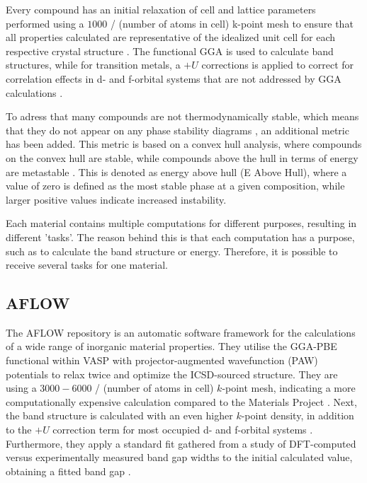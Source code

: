 
Every compound has an initial relaxation of cell and lattice parameters performed using a $1000$ / (number of atoms in cell) k-point mesh to ensure that all properties calculated are representative of the idealized unit cell for each respective crystal structure \cite{Ferrenti2020}. The functional GGA is used to calculate band structures, while for transition metals, a $+U$ corrections is applied to correct for correlation effects in d- and f-orbital systems that are not addressed by GGA calculations \cite{Wang2006}.

To adress that many compounds are not thermodynamically stable, which means that they do not appear on any phase stability diagrams \cite{Sun2016}, an additional metric has been added. This metric is based on a convex hull analysis, where compounds on the convex hull are stable, while compounds above the hull in terms of energy are metastable \cite{Jain2018}. This is denoted as energy above hull (E Above Hull), where a value of zero is defined as the most stable phase at a given composition, while larger positive values indicate increased instability.

Each material contains multiple computations for different purposes, resulting in different 'tasks'. The reason behind this is that each computation has a purpose, such as to calculate the band structure or energy. Therefore, it is possible to receive several tasks for one material.

\subsection{AFLOW}

The AFLOW\cite{Curtarolo2012, Curtarolo2012a, Calderon2015} repository is an automatic software framework for the calculations of a wide range of inorganic material properties. They utilise the GGA-PBE functional within VASP with projector-augmented wavefunction (PAW) potentials to relax twice and optimize the ICSD-sourced structure. They are using a $3000-6000$ / (number of atoms in cell) $k$-point mesh, indicating a more computationally expensive calculation compared to the Materials Project \cite{Ferrenti2020}. Next, the band structure is calculated with an even higher $k$-point density, in addition to the $+U$ correction term for most occupied d- and f-orbital systems \cite{Setyawan2010}. Furthermore, they apply a standard fit gathered from a study of DFT-computed versus experimentally measured band gap widths to the initial calculated value, obtaining a fitted band gap \cite{Setyawan2011}.

